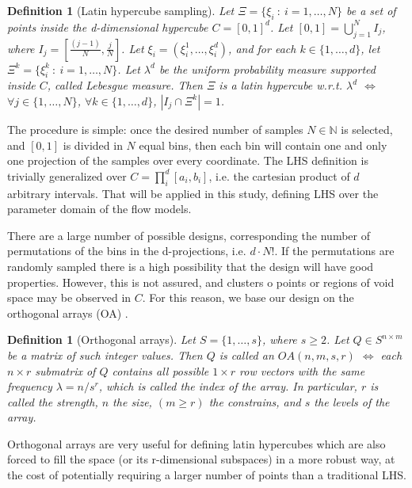 \documentclass{article}
\newtheorem{definition}[theorem]{Definition}
\begin{document}
\begin{definition}[Latin hypercube sampling]
Let $\Xi=\{\xi_i\ :\ i=1,\dots,N\}$ be a set of points inside the d-dimensional hypercube $C=[0,1]^d$. Let $[0,1]=\bigcup_{j=1}^{N} I_j$, where $I_j=[\frac{(j-1)}{N},\frac{j}{N}]$. Let $\xi_i=\left(\xi_i^1,\dots,\xi_i^d\right)$, and for each $k\in\{1,\dots,d\}$, let $\Xi^k=\{\xi^k_i\ :\ i=1,\dots,N\}$. Let $\lambda^d$ be the uniform probability measure supported inside $C$, called Lebesgue measure. Then $\Xi$ is a latin hypercube w.r.t. $\lambda^d$ $\Longleftrightarrow$ $\forall j\in \{1,\dots,N\}$, $\forall k\in\{1,\dots,d\}$, $\left|I_j\cap\Xi^k\right|=1$.
\end{definition}

The procedure is simple: once the desired number of samples $N\in\mathbb N$ is selected, and $[0,1]$ is divided in $N$ equal bins, then each bin will contain one and only one projection of the samples over every coordinate. The LHS definition is trivially generalized over $C=\prod^d_i [a_i, b_i]$, i.e. the cartesian product of $d$ arbitrary intervals. That will be applied in this study, defining LHS over the parameter domain of the flow models.

There are a large number of possible designs, corresponding the number of permutations of the bins in the d-projections, i.e. $d\cdot N!$. If the permutations are randomly sampled there is a high possibility that the design will have good properties. However, this is not assured, and clusters o points or regions of void space may be observed in $C$. For this reason, we base our design on the orthogonal arrays (OA) \citep{Owen1992a,Tang1993}.

\begin{definition}[Orthogonal arrays]
Let $S=\{1,\dots,s\}$, where $s\ge 2$. Let $Q\in S^{n\times m}$ be a matrix of such integer values. Then $Q$ is called an $OA(n,m,s,r)$ $\Longleftrightarrow$ each $n\times r$ submatrix of $Q$ contains all possible $1\times r$ row vectors with the same frequency $\lambda=n/s^r$, which is called the index of the array. In particular, $r$ is called the strength, $n$ the size, $(m\ge r)$ the constrains, and $s$ the levels of the array.
\end{definition}

Orthogonal arrays are very useful for defining latin hypercubes which are also forced to fill the space (or its r-dimensional subspaces) in a more robust way, at the cost of potentially requiring a larger number of points than a traditional LHS.
\end{document}
